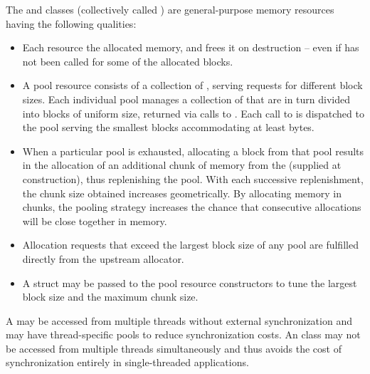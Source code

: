 \pnum
The  and
 classes
(collectively called )
are general-purpose memory resources having the following qualities:
\begin{itemize}
\item
Each resource  the allocated memory, and frees it on destruction --
even if  has not been called for some of the allocated blocks.
\item
A pool resource consists of a collection of ,
serving requests for different block sizes.
Each individual pool manages a collection of 
that are in turn divided into blocks of uniform size,
returned via calls to .
Each call to  is dispatched
to the pool serving the smallest blocks accommodating at least  bytes.
\item
When a particular pool is exhausted,
allocating a block from that pool results in the allocation
of an additional chunk of memory from the 
(supplied at construction), thus replenishing the pool.
With each successive replenishment,
the chunk size obtained increases geometrically.
\enternote
By allocating memory in chunks,
the pooling strategy increases the chance that consecutive allocations
will be close together in memory.\exitnote
\item
Allocation requests that exceed the largest block size of any pool
are fulfilled directly from the upstream allocator.
\item
A  struct may be passed to the pool resource constructors
to tune the largest block size and the maximum chunk size.
\end{itemize}

\pnum
A  may be accessed from multiple threads
without external synchronization
and may have thread-specific pools to reduce synchronization costs.
An  class may not be accessed
from multiple threads simultaneously
and thus avoids the cost of synchronization entirely
in single-threaded applications.

